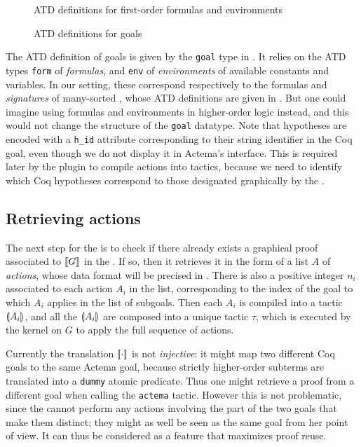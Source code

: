 \begin{figure}
  
  \caption{ATD definitions for first-order formulas and environments}
\end{figure}

\begin{figure}
  
  \caption{ATD definitions for goals}
\end{figure}

The ATD definition of goals is given by the \texttt{goal} type in
. It relies on
the ATD types \texttt{form} of \emph{formulas}, and \texttt{env} of
\emph{environments} of available constants and variables. In our setting, these
correspond respectively to the formulas and \emph{signatures} of many-sorted
, whose ATD definitions are given in . But one
could imagine using formulas and environments in higher-order logic instead, and
this would not change the structure of the \texttt{goal} datatype. Note that
hypotheses are encoded with a \texttt{h\_id} attribute corresponding to their
string identifier in the Coq goal, even though we do not display it in Actema's
interface. This is required later by the plugin to compile actions into tactics,
because we need to identify which Coq hypotheses correspond to those designated
graphically by the .

\subsection{Retrieving actions}

The next step for the  is to check if there already exists a
graphical proof associated to $\llbracket G \rrbracket$ in the . If so,
then it retrieves it in the form of a list $A$ of \emph{actions}, whose data
format will be precised in . There is also a positive
integer $n_i$ associated to each action $A_i$ in the list, corresponding to the
index of the goal to which $A_i$ applies in the list of subgoals. Then each
$A_i$ is compiled into a tactic $\llparenthesis A_i \rrparenthesis$, and all the $\llparenthesis A_i \rrparenthesis$
are composed into a unique tactic $\tau$, which is executed by the kernel on $G$
to apply the full sequence of actions.

\begin{remark}
  Currently the translation $\llbracket \cdot \rrbracket$ is not \emph{injective}: it might
  map two different Coq goals to the same Actema goal, because strictly
  higher-order subterms are translated into a \texttt{dummy} atomic predicate.
  Thus one might retrieve a proof from a different goal when calling the
  \texttt{actema} tactic. However this is not problematic, since the
   cannot perform any actions involving the part of the two goals
  that make them distinct; they might as well be seen as the same goal from her
  point of view. It can thus be considered as a feature that maximizes proof
  reuse.
\end{remark}


